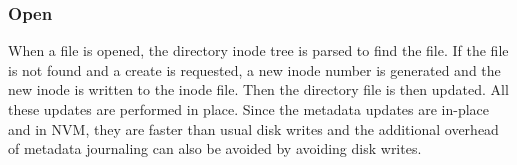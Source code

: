 \subsubsection{Open}
When a file is opened, the directory inode tree is parsed to find the file. If the file is not found and a create is requested, a new inode number is generated and the new inode is written to the inode file. Then the directory file is then updated. All these updates are performed in place. Since the metadata updates are in-place and in NVM, they are faster than usual disk writes and the additional overhead of metadata journaling can also be avoided by avoiding disk writes.
